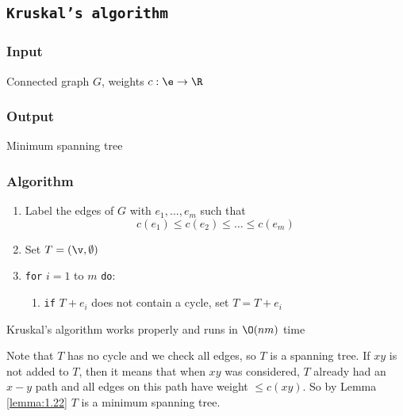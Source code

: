 \subsection{\texttt{Kruskal's algorithm}}
\subsubsection{Input}
Connected graph $G$, weights $c: \e \rightarrow \R$
\subsubsection{Output}
Minimum spanning tree
\subsubsection{Algorithm}
\begin{enumerate}
    \item Label the edges of $G$ with $e_1, \dots, e_m$ such that
    \begin{equation*}
        c(e_1) \leq c(e_2) \leq \dots \leq c(e_m)
    \end{equation*}
    \item Set $T = (\v, \emptyset)$
    \item \texttt{for} $i = 1$ to $m$ \texttt{do}:
    \begin{enumerate}
        \item \texttt{if} $T + e_i$ does not contain a cycle, set $T = T + e_i$
    \end{enumerate}
\end{enumerate}
\begin{customtheorem}{1.23}
    \label{theorem:1.23}
    Kruskal's algorithm works properly and runs in $\O(nm)$ time
\end{customtheorem}
\begin{prf}
    Note that $T$ has no cycle and we check all edges, so $T$ is a spanning tree. If $xy$ is not added to $T$, then it means that when $xy$ was considered, $T$ already had an $x - y$ path and all edges on this path have weight $\leq c(xy)$. So by Lemma \ref{lemma:1.22} $T$ is a minimum spanning tree.
\end{prf}